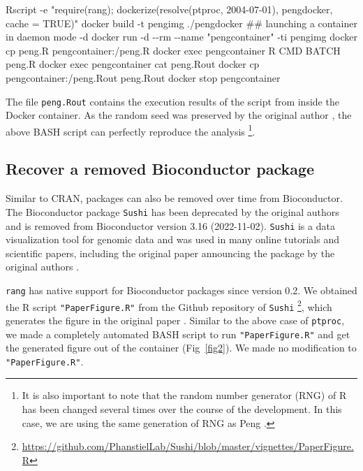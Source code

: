 \documentclass[
  10pt,
  letterpaper,
]{article}
\newenvironment{Shaded}{\begin{snugshade}}{\end{snugshade}}
\newcommand{\AttributeTok}[1]{\textcolor[rgb]{0.40,0.45,0.13}{#1}}
\newcommand{\CommentTok}[1]{\textcolor[rgb]{0.37,0.37,0.37}{#1}}
\newcommand{\ExtensionTok}[1]{\textcolor[rgb]{0.00,0.23,0.31}{#1}}
\newcommand{\NormalTok}[1]{\textcolor[rgb]{0.00,0.23,0.31}{#1}}
\newcommand{\StringTok}[1]{\textcolor[rgb]{0.13,0.47,0.30}{#1}}
\begin{document}
\begin{Shaded}
\begin{Highlighting}[]
\ExtensionTok{Rscript} \AttributeTok{{-}e} \StringTok{"require(rang); dockerize(resolve(\textquotesingle{}ptproc\textquotesingle{}, \textquotesingle{}2004{-}07{-}01\textquotesingle{}),}
\StringTok{\textquotesingle{}pengdocker\textquotesingle{}, cache = TRUE)"}
\ExtensionTok{docker}\NormalTok{ build }\AttributeTok{{-}t}\NormalTok{ pengimg ./pengdocker}
\CommentTok{\#\# launching a container in daemon mode {-}d}
\ExtensionTok{docker}\NormalTok{ run }\AttributeTok{{-}d} \AttributeTok{{-}{-}rm} \AttributeTok{{-}{-}name} \StringTok{"pengcontainer"} \AttributeTok{{-}ti}\NormalTok{ pengimg}
\ExtensionTok{docker}\NormalTok{ cp peng.R pengcontainer:/peng.R}
\ExtensionTok{docker}\NormalTok{ exec pengcontainer R CMD BATCH peng.R}
\ExtensionTok{docker}\NormalTok{ exec pengcontainer cat peng.Rout}
\ExtensionTok{docker}\NormalTok{ cp pengcontainer:/peng.Rout peng.Rout}
\ExtensionTok{docker}\NormalTok{ stop pengcontainer}
\end{Highlighting}
\end{Shaded}

The file \texttt{peng.Rout} contains the execution results of the script
from inside the Docker container. As the random seed was preserved by
the original author \citep{peng:2003:MDP}, the above BASH script can
perfectly reproduce the analysis \footnote{It is also important to note
  that the random number generator (RNG) of R has been changed several
  times over the course of the development. In this case, we are using
  the same generation of RNG as Peng \citep{peng:2003:MDP}.}.

\hypertarget{recover-a-removed-bioconductor-package}{%
\subsection{Recover a removed Bioconductor
package}\label{recover-a-removed-bioconductor-package}}

Similar to CRAN, packages can also be removed over time from
Bioconductor. The Bioconductor package \texttt{Sushi} has been
deprecated by the original authors and is removed from Bioconductor
version 3.16 (2022-11-02). \texttt{Sushi} is a data visualization tool
for genomic data and was used in many online tutorials and scientific
papers, including the original paper announcing the package by the
original authors \citep{phanstiel:2014:S}.

\texttt{rang} has native support for Bioconductor packages since version
0.2. We obtained the R script \texttt{"PaperFigure.R"} from the Github
repository of \texttt{Sushi} \footnote{\url{https://github.com/PhanstielLab/Sushi/blob/master/vignettes/PaperFigure.R}},
which generates the figure in the original paper
\citep{phanstiel:2014:S}. Similar to the above case of \texttt{ptproc},
we made a completely automated BASH script to run
\texttt{"PaperFigure.R"} and get the generated figure out of the
container (Fig~\ref{fig2}). We made no modification to
\texttt{"PaperFigure.R"}.
\end{document}
